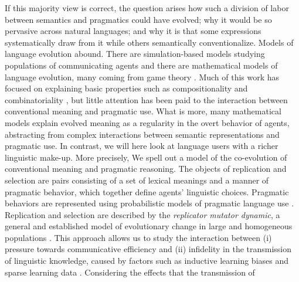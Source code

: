 \documentclass[a4paper, 11pt]{article}
\theoremstyle{Satz}
\begin{document}
If this majority view is correct, the question arises how such a division of labor between
semantics and pragmatics could have evolved; why it would be so pervasive across natural
languages; and why it is that some expressions systematically draw from it while others semantically conventionalize. Models of language evolution abound. There are simulation-based models studying
populations of communicating agents
\citep{Hurford1989:Biological-Evol,Steels1995:A-Self-Organizi,LenaertsJansen2005:The-Evolutionar,SteelsBelpaeme2005:Coordinating-Pe,BaronchelliPuglisi2008:Cultural-route-,steels:2011,SpikeStadler2016:Minimal-Require}
and there are mathematical models of language evolution, many coming from game theory
\citep{Warneryd1993:Cheap-Talk-Coor,BlumeKim1993:Evolutionary-St,nowak+krakauer:1999,nowak:2006,Huttegger2007:Evolution-and-t,Skyrms2010:Signals}. Much
of this work has focused on explaining basic properties such as compositionality and
combinatoriality
\citep[e.g.,][]{Batali1998:Computational-S,nowak+krakauer:1999,nowak+etal:2000,KirbyHurford2002:The-Emergence-o,kirby:2002,SmithKirby2003:Iterated-Learni,Gong2007:Language-Evolut,kirby+etal:2015,verhoef+etal:2014,Franke2015:Proto-Syntax},
but little attention has been paid to the interaction between conventional meaning and
pragmatic use. What is more, many mathematical models explain evolved meaning as a regularity
in the overt behavior of agents, abstracting from complex interactions between semantic
representations and pragmatic use. In contrast, we will here look at language users with a
richer linguistic make-up. More precisely, We spell out a model of the co-evolution of conventional meaning and pragmatic reasoning.
The objects of replication and selection are pairs consisting of a set of lexical
meanings and a manner of pragmatic behavior, which together define agents' linguistic choices. Pragmatic behaviors are represented using probabilistic models of pragmatic language use \citep{frank+goodman:2012,FrankeJager2015:Probabilistic-p,GoodmanFrank2016:Pragmatic-Langu}. Replication
and selection are described by the \emph{replicator mutator dynamic}, a general and established
model of evolutionary change in large and homogeneous populations
\citep{Hofbauer1985:The-Selection-M,nowak+etal:2000,NowakKomarova2001:Evolution-of-Un,hofbauer+sigmund:2003,nowak:2006}. This
approach allows us to study the interaction between (i) pressure towards communicative
efficiency and (ii) infidelity in the transmission of linguistic knowledge, caused by factors
such as inductive learning biases and sparse learning data \citep{KirbyHurford2002:The-Emergence-o,SmithKirby2003:Iterated-Learni,KirbyGriffith2014:Iterated-Learni}. Considering the effects that the transmission of
\end{document}
